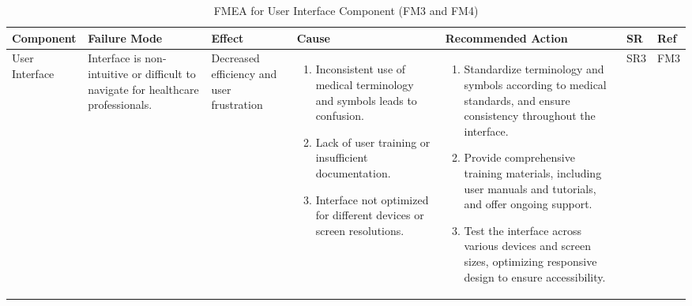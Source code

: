 \documentclass{article}
\begin{document}
\begin{landscape}
    \begin{table}[ht]
    \centering
    \caption{FMEA for User Interface Component (FM3 and FM4)}
    \renewcommand{\arraystretch}{1.1}
    {
    \setlength{\tabcolsep}{2pt}
    \begin{tabular}{|p{2.5cm}|p{2.5cm}|p{3cm}|p{5cm}|p{6cm}|p{1cm}|p{1cm}|}
    \hline
    \textbf{Component} & \textbf{Failure Mode} & \textbf{Effect} & \textbf{Cause} & \textbf{Recommended Action} & \textbf{SR} & \textbf{Ref} \\
    \hline

    User Interface
     & Interface is non-intuitive or difficult to navigate for healthcare professionals.
     & Decreased efficiency and user frustration
     &
     \begin{enumerate}[leftmargin=*, label={\alph*.}, itemsep=1pt]
         \item Inconsistent use of medical terminology and symbols leads to confusion.
         \item Lack of user training or insufficient documentation.
         \item Interface not optimized for different devices or screen resolutions.
     \end{enumerate}
     &
     \begin{enumerate}[leftmargin=*, label={\alph*.}, itemsep=1pt]
         \item Standardize terminology and symbols according to medical standards, and ensure consistency throughout the interface.
         \item Provide comprehensive training materials, including user manuals and tutorials, and offer ongoing support.
         \item Test the interface across various devices and screen sizes, optimizing responsive design to ensure accessibility.
     \end{enumerate}
     & SR3 & FM3 \\ \hline


\end{tabular}}
\end{table}
\end{landscape}
\end{document}
